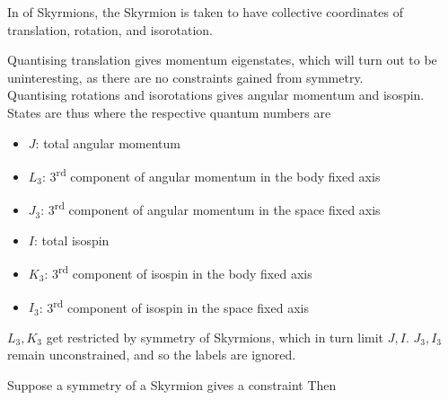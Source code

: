 \documentclass{article}
\begin{document}
\begin{definition}
In  of Skyrmions, the Skyrmion is taken to have collective coordinates of translation, rotation, and isorotation. 
\end{definition}
Quantising translation gives momentum eigenstates, which will turn out to be uninteresting, as there are no constraints gained from symmetry. \\
Quantising rotations and isorotations gives angular momentum and isospin. States are thus 
where the respective quantum numbers are 
\begin{itemize}
    \item $J$: total angular momentum 
    \item $L_3$: 3\textsuperscript{rd} component of angular momentum in the body fixed axis
    \item $J_3$: 3\textsuperscript{rd} component of angular momentum in the space fixed axis 
    \item $I$: total isospin 
    \item $K_3$: 3\textsuperscript{rd} component of isospin in the body fixed axis
    \item $I_3$: 3\textsuperscript{rd} component of isospin in the space fixed axis 
\end{itemize}
$L_3, K_3$ get restricted by symmetry of Skyrmions, which in turn limit $J,I$. $J_3,I_3$ remain unconstrained, and so the labels are ignored. 

\begin{prop}
Suppose a symmetry of a Skyrmion gives a constraint 
Then 
\end{prop}



\end{document}
